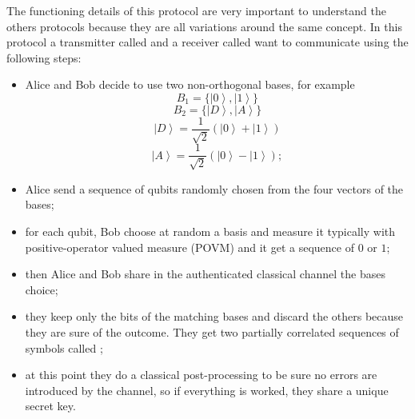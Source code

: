 The functioning details of this protocol are very important to understand the others protocols because they are all variations around the same concept. In this protocol a transmitter called  and a receiver called  want to communicate using the following steps:

\begin{itemize}
  \item Alice and Bob decide to use two non-orthogonal bases, for example
        \begin{equation}
          B_1 = \{\left|0\right>, \left|1\right>\}
        \end{equation}
        \begin{equation}
          B_2 = \{\left|D\right>, \left|A\right>\}
        \end{equation}
        \begin{equation}
          \left|D\right> = \frac{1}{\sqrt{2}} (\left|0\right> + \left|1\right>)
        \end{equation}
        \begin{equation}
          \left|A\right> = \frac{1}{\sqrt{2}} (\left|0\right> - \left|1\right>);
        \end{equation}
  \item Alice send a sequence of qubits randomly chosen from the four vectors of the bases;
  \item for each qubit, Bob choose at random a basis and measure it typically with positive-operator valued measure (POVM) and it get a sequence of $0$ or $1$;
  \item then Alice and Bob share in the authenticated classical channel the bases choice;
  \item they keep only the bits of the matching bases and discard the others because they are sure of the outcome. They get two partially correlated sequences of symbols called ;
  \item at this point they do a classical post-processing to be sure no errors are introduced by the channel, so if everything is worked, they share a unique secret key.
\end{itemize}

